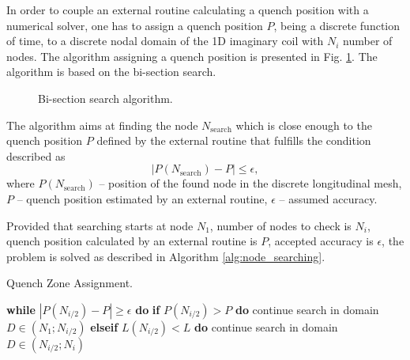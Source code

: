 
In order to couple an external routine calculating a quench position with a numerical solver, one has to assign a quench position $P$, being a discrete function of time, to a discrete nodal domain of the 1D imaginary coil with $N_i$ number of nodes. The algorithm assigning a quench position is presented in Fig. \ref{fig:node_search_algo}. The algorithm is based on the bi-section search. 

\begin{figure}[H]
    \centering
    \caption{Bi-section search algorithm.}
    \label{fig:node_search_algo}
\end{figure}

The algorithm aims at finding the node $N_\text{search}$ which is close enough to the quench position $P$ defined by the external routine that fulfills the condition described as
\begin{equation}
    |P(N_\text{search}) - P| \leq \epsilon,
    \label{eqn:bi-section_search}
\end{equation}
where $P(N_\text{search})$ -- position of the found node in the discrete longitudinal mesh, $P$ -- quench position estimated by an external routine, $\epsilon$ -- assumed accuracy. 

Provided that searching starts at node $N_1$, number of nodes to check is $N_i$, quench position calculated by an external routine is $P$, accepted accuracy is $\epsilon$, the problem is solved as described in Algorithm \ref{alg:node_searching}.

\begin{algorithm}[H]
    \caption{Quench Zone Assignment.}
    \label{alg:node_searching}
    \begin{algorithmic}[1]

    \STATE \textbf{while} $|P(N_{i/2}) - P| \geq \epsilon$ \textbf{do}
    \STATE \hspace{0.5cm} \textbf{if} $P(N_{i/2}) > P$ \textbf{do}
    \STATE \hspace{1.0cm} continue search in domain $D \in (N_1;N_{i/2})$
    \STATE \hspace{0.5cm} \textbf{elseif} $L(N_{i/2}) < L$ \textbf{do}
    \STATE \hspace{1.0cm} continue search in domain $D \in (N_{i/2}; N_i)$
    \end{algorithmic}
\end{algorithm}

